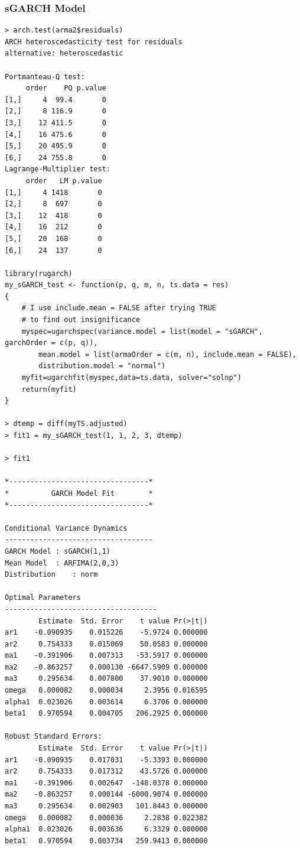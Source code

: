 \documentclass[a4paper,10pt]{article}
\begin{document}
\subsubsection{sGARCH Model}
\begin{verbatim}
> arch.test(arma2$residuals)
ARCH heteroscedasticity test for residuals 
alternative: heteroscedastic 

Portmanteau-Q test: 
     order    PQ p.value
[1,]     4  99.4       0
[2,]     8 116.9       0
[3,]    12 411.5       0
[4,]    16 475.6       0
[5,]    20 495.9       0
[6,]    24 755.8       0
Lagrange-Multiplier test: 
     order   LM p.value
[1,]     4 1418       0
[2,]     8  697       0
[3,]    12  418       0
[4,]    16  212       0
[5,]    20  168       0
[6,]    24  137       0

library(rugarch)
my_sGARCH_test <- function(p, q, m, n, ts.data = res)
{
	# I use include.mean = FALSE after trying TRUE
	# to find out insignificance
    myspec=ugarchspec(variance.model = list(model = "sGARCH", garchOrder = c(p, q)), 
    	mean.model = list(armaOrder = c(m, n), include.mean = FALSE), 
    	distribution.model = "normal")
    myfit=ugarchfit(myspec,data=ts.data, solver="solnp")
    return(myfit)  
}

> dtemp = diff(myTS.adjusted)
> fit1 = my_sGARCH_test(1, 1, 2, 3, dtemp)

> fit1

*---------------------------------*
*          GARCH Model Fit        *
*---------------------------------*

Conditional Variance Dynamics 	
-----------------------------------
GARCH Model	: sGARCH(1,1)
Mean Model	: ARFIMA(2,0,3)
Distribution	: norm 

Optimal Parameters
------------------------------------
        Estimate  Std. Error    t value Pr(>|t|)
ar1    -0.090935    0.015226    -5.9724 0.000000
ar2     0.754333    0.015069    50.0583 0.000000
ma1    -0.391906    0.007313   -53.5917 0.000000
ma2    -0.863257    0.000130 -6647.5909 0.000000
ma3     0.295634    0.007800    37.9010 0.000000
omega   0.000082    0.000034     2.3956 0.016595
alpha1  0.023026    0.003614     6.3706 0.000000
beta1   0.970594    0.004705   206.2925 0.000000

Robust Standard Errors:
        Estimate  Std. Error    t value Pr(>|t|)
ar1    -0.090935    0.017031    -5.3393 0.000000
ar2     0.754333    0.017312    43.5726 0.000000
ma1    -0.391906    0.002647  -148.0378 0.000000
ma2    -0.863257    0.000144 -6000.9074 0.000000
ma3     0.295634    0.002903   101.8443 0.000000
omega   0.000082    0.000036     2.2838 0.022382
alpha1  0.023026    0.003636     6.3329 0.000000
beta1   0.970594    0.003734   259.9413 0.000000


\end{verbatim}
\end{document}
